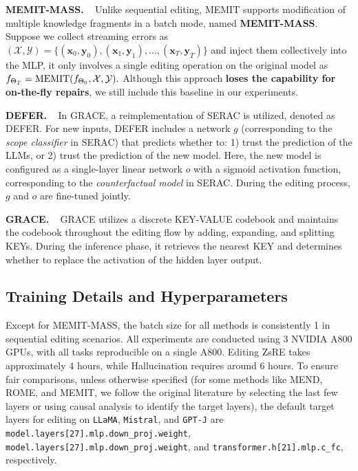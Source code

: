 \documentclass{article}
\begin{document}
\textbf{MEMIT-MASS.} ~
Unlike sequential editing, MEMIT supports modification of multiple knowledge fragments in a batch mode, named \textbf{MEMIT-MASS}.
Suppose we collect streaming errors as $(\mathcal{X}, \mathcal{Y}) = \{(\mathbf{x}_0, \mathbf{y}_0), (\mathbf{x}_1, \mathbf{y}_1), ..., (\mathbf{x}_T, \mathbf{y}_T)\}$ and inject them collectively into the MLP, it only involves a single editing operation on the original model as $f_{\Theta_{T}} = {\rm MEMIT}(f_{\Theta_{0}}, \mathcal{X}, \mathcal{Y}).$
Although this approach \textbf{loses the capability for on-the-fly repairs}, we still include this baseline in our experiments.

\textbf{DEFER.} ~
In GRACE, a reimplementation of SERAC \cite{serac} is utilized, denoted as DEFER.
For new inputs, DEFER includes a network $g$ (corresponding to the \textit{scope classifier} in SERAC) that predicts whether to: 1) trust the prediction of the LLMs, or 2) trust the prediction of the new model.
Here, the new model is configured as a single-layer linear network $o$ with a sigmoid activation function, corresponding to the \textit{counterfactual model} in SERAC.
During the editing process, $g$ and $o$ are fine-tuned jointly.

\textbf{GRACE.} ~
GRACE \cite{grace} utilizes a discrete KEY-VALUE codebook and maintains the codebook throughout the editing flow by adding, expanding, and splitting KEYs.
During the inference phase, it retrieves the nearest KEY and determines whether to replace the activation of the hidden layer output.

\subsection{Training Details and Hyperparameters} \label{app_sec: training_details}
Except for MEMIT-MASS, the batch size for all methods is consistently 1 in sequential editing scenarios.
All experiments are conducted using 3 NVIDIA A800 GPUs, with all tasks reproducible on a single A800.
Editing ZsRE takes approximately 4 hours, while Hallucination requires around 6 hours.
To ensure fair comparisons, unless otherwise specified (for some methods like MEND, ROME, and MEMIT, we follow the original literature by selecting the last few layers or using causal analysis to identify the target layers), the default target layers for editing on \texttt{LLaMA}, \texttt{Mistral}, and \texttt{GPT-J} are \texttt{model.layers[27].mlp.down\_proj.weight}, \texttt{model.layers[27].mlp.down\_proj.weight}, and \texttt{transformer.h[21].mlp.c\_fc}, respectively.
\end{document}
